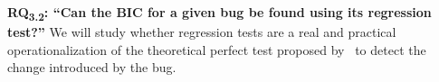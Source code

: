 \newcommand{\rqtwo}[0]{RQ\textsubscript{3.2}: ``Can the BIC for a given bug be found using its regression test?''}
\textbf{\rqtwo}
We will study whether regression tests are a real and practical operationalization of the theoretical perfect test proposed by \gema ~to detect the change introduced by the bug.





